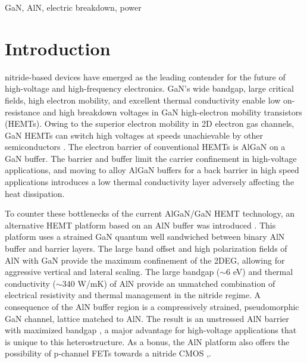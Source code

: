 \documentclass[journal]{IEEEtran}
\begin{document}
\begin{IEEEkeywords}
  GaN, AlN, electric breakdown, power
\end{IEEEkeywords}

%
\IEEEpeerreviewmaketitle
\section{Introduction}
 nitride-based devices have emerged as the leading contender for the future of high-voltage and high-frequency electronics. GaN's wide bandgap, large critical fields, high electron mobility, and excellent thermal conductivity enable low on-resistance and high breakdown voltages in GaN high-electron mobility transistors (HEMTs). Owing to the superior electron mobility in 2D electron gas channels, GaN HEMTs can switch high voltages at speeds unachievable by other semiconductors \cite{Danilovic2011}. The electron barrier of conventional HEMTs is AlGaN on a GaN buffer. The barrier and buffer limit the carrier confinement in high-voltage applications, and moving to alloy AlGaN buffers for a back barrier in high speed applications \cite{Shinohara2010, Shinohara2011, Lee2011} introduces a low thermal conductivity layer adversely affecting the heat dissipation.

To counter these bottlenecks of the current AlGaN/GaN HEMT technology, an alternative HEMT platform based on an AlN buffer was introduced \cite{Wang2012}. This platform uses a strained GaN quantum well sandwiched between binary AlN buffer and barrier layers. The large band offset and high polarization fields of AlN with GaN provide the maximum confinement of the 2DEG, allowing for aggressive vertical and lateral scaling. The large bandgap ($\sim$6 eV) and thermal conductivity ($\sim$340 W/mK) \cite{Rounds2018} of AlN provide an unmatched combination of electrical resistivity and thermal management in the nitride regime. A consequence of the AlN buffer region is a compressively strained, pseudomorphic GaN channel, lattice matched to AlN. The result is an unstressed AlN barrier with maximized bandgap \textcolor{black}{\cite{Li2014}}, a major advantage for high-voltage applications that is unique to this heterostructure. As a bonus, the AlN platform also offers the possibility of p-channel FETs towards a nitride CMOS \cite{Li2013},\cite{Bader2018}.
\end{document}
